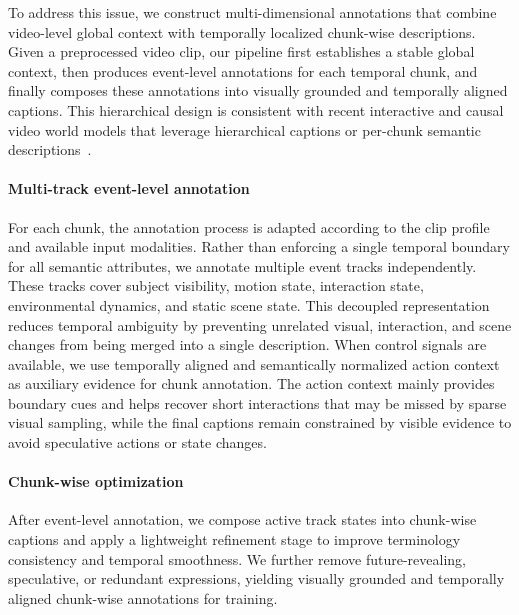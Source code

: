 To address this issue, we construct multi-dimensional annotations that combine video-level global context with temporally localized chunk-wise descriptions. 
Given a preprocessed video clip, our pipeline first establishes a stable global context, then produces event-level annotations for each temporal chunk, and finally composes these annotations into visually grounded and temporally aligned captions. This hierarchical design is consistent with recent interactive and causal video world models that leverage hierarchical captions or per-chunk semantic descriptions~\cite{meng2026causalcine,longlive_2.0,Yesiltepe_2026_CVPR}.

\paragraph{Multi-track event-level annotation} 
For each chunk, the annotation process is adapted according to the clip profile and available input modalities.
Rather than enforcing a single temporal boundary for all semantic attributes, we annotate multiple event tracks independently. These tracks cover subject visibility, motion state, interaction state, environmental dynamics, and static scene state. 
This decoupled representation reduces temporal ambiguity by preventing unrelated visual, interaction, and scene changes from being merged into a single description. 
When control signals are available, we use temporally aligned and semantically normalized action context as auxiliary evidence for chunk annotation. 
The action context mainly provides boundary cues and helps recover short interactions that may be missed by sparse visual sampling, while the final captions remain constrained by visible evidence to avoid speculative actions or state changes.

\paragraph{Chunk-wise optimization}
After event-level annotation, we compose active track states into chunk-wise captions and apply a lightweight refinement stage to improve terminology consistency and temporal smoothness. 
We further remove future-revealing, speculative, or redundant expressions, yielding visually grounded and temporally aligned chunk-wise annotations for training.